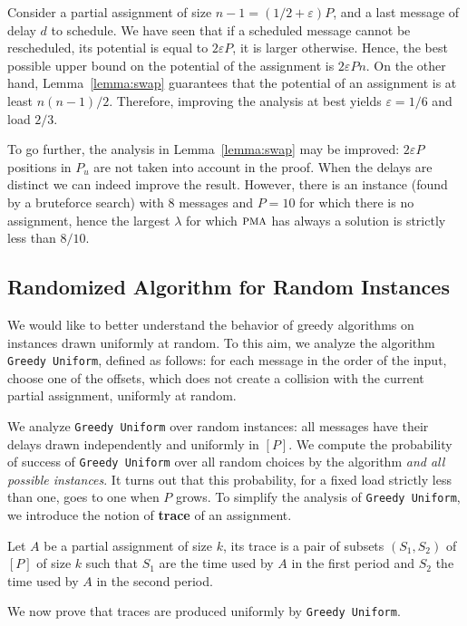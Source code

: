 \documentclass[a4paper,UKenglish,cleveref, autoref, thm-restate]{lipics-v2019}
\newcommand\pma{\textsc{pma}\xspace}
\newcommand\greedyuniform{\texttt{Greedy Uniform}\xspace}
\begin{document}
Consider a partial assignment of size $n-1 = (1/2 + \varepsilon)P$, and a last message of delay $d$ to schedule.
We have seen that if a scheduled message cannot be rescheduled, its potential is equal to $2\varepsilon P$, it is larger otherwise.
Hence, the best possible upper bound on the potential of the assignment is $2\varepsilon P n$. On the other hand, Lemma~\ref{lemma:swap} guarantees that the potential of an assignment is at least $n(n-1)/2$. Therefore, improving the analysis at best yields $\varepsilon = 1/6$ and 
load $2/3$.

To go further, the analysis in Lemma~\ref{lemma:swap} may be improved: $2\varepsilon P$ positions in $P_{u}$ are not taken into account in the proof. When the delays are distinct we can indeed improve the result. However, there is an instance (found by a bruteforce search) with $8$ messages and $P=10$ for which there is no assignment, hence the largest $\lambda$ for which $\pma$ has always a solution is strictly less than $8/10$. 

\subsection{Randomized Algorithm for Random Instances}

We would like to better understand the behavior of greedy algorithms on instances drawn uniformly at random. To this aim, we analyze the algorithm \greedyuniform, defined as follows: for each message in the order of the input, choose one of the offsets, which does not create a collision with the current partial assignment, uniformly at random. 

We analyze \greedyuniform over random instances:  all messages have their delays drawn independently and uniformly in $[P]$. We compute the probability of success of \greedyuniform over all random choices by the algorithm \emph{and all possible instances}. 
It turns out that this probability, for a fixed load strictly less than one, goes to one when $P$ grows. To simplify the analysis of \greedyuniform, we introduce the notion of \textbf{trace} of an assignment. 

\begin{definition}
Let $A$ be a partial assignment of size $k$, its trace is a pair of subsets $(S_1,S_2)$ of $[P]$ of size $k$ such that $S_1$ are the time used by $A$ in the first period and $S_2$ the time used by $A$ in the second period.
\end{definition}

 We now prove that traces are produced uniformly by \greedyuniform.
\end{document}
